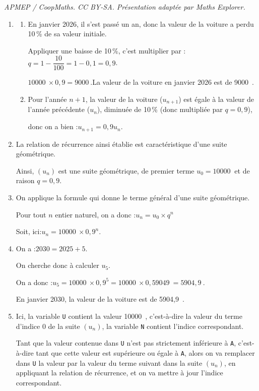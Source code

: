 \documentclass[10pt]{article}
\providecommand{\euro}{\texteuro}
\providecommand{\np}[2][]{{#2~#1}}
\providecommand{\euro}{{\text{€}}}
\renewcommand{\euro}{\ifmmode\text{\texteuro}\else\texteuro\fi}
\begin{document}
\noindent\textit{APMEP / CoopMaths. CC BY-SA. Présentation adaptée par Maths Explorer.}\par\medskip
\begin{enumerate}
	\item \begin{enumerate}
		\item En janvier 2026, il s'est passé un an, donc la valeur de la voiture a perdu 10\,\% de sa valeur initiale.

		Appliquer une baisse de 10\,\%, c'est multiplier par :\quad $q = 1 - \dfrac{10}{100} = 1 - 0,1 = 0,9$.

		$\np{10000} \times 0,9 = \np{9000}.$\quad	La valeur de la voiture en janvier 2026 est de \np[\euro]{9000}.

		\item Pour l'année $n+1$, la valeur de la voiture ($u_{n+1}$) est égale à la valeur de l'année précédente ($u_n$), diminuée de 10\,\% (donc multipliée par $q = 0,9$),

		donc on a bien :\quad $u_{n+1} = 0,9u_n$.
	\end{enumerate}

	\item La relation de récurrence ainsi établie est caractéristique d'une suite géométrique.

	Ainsi, $(u_n)$ est une suite géométrique, de premier terme $u_0 = \np{10000}$ et de raison $q = 0,9$.

	\item On applique la formule qui donne le terme général d'une suite géométrique.

	Pour tout $n$ entier naturel, on a donc :\quad $u_n = u_0\times q^n$

	Soit, ici:\quad $u_n = \np{10000}\times 0,9^n$.

	\item On a :\quad $2030 = 2025 + 5$.

	On cherche donc à calculer $u_5$.

	On a donc :\quad $u_5 = \np{10000}\times 0,9^5 = \np{10000} \times \np{0,59049} = \np{5904,9}$.

	En janvier 2030, la valeur de la voiture est de \np[\euro]{5904,9}.

	\item Ici, la variable \texttt{U} contient la valeur \np{10000}, c'est-à-dire la valeur du terme d'indice 0 de la suite $(u_n)$, la variable \texttt{N} contient l'indice correspondant.

	Tant que la valeur contenue dans \texttt{U} n'est pas strictement inférieure à \texttt{A}, c'est-à-dire tant que cette valeur est supérieure ou égale à \texttt{A}, alors on va remplacer dans \texttt{U} la valeur par la valeur du terme suivant dans la suite $(u_n)$, en appliquant la relation de récurrence, et on va mettre à jour l'indice correspondant.


\end{enumerate}
\end{document}
